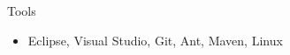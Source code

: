 \cvitem
    {Tools}
    {\begin{itemize}
        \item Eclipse, Visual Studio, Git, Ant, Maven, Linux
    \end{itemize}}
    \vspace*{-\baselineskip}